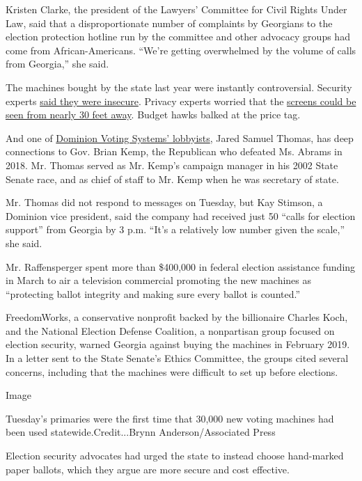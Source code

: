 Kristen Clarke, the president of the Lawyers' Committee for Civil Rights
Under Law, said that a disproportionate number of complaints by
Georgians to the election protection hotline run by the committee and
other advocacy groups had come from African-Americans. ``We're getting
overwhelmed by the volume of calls from Georgia,'' she said.

The machines bought by the state last year were instantly controversial.
Security experts
\href{https://www.politico.com/story/2019/03/28/georgia-voting-machines-safe-1241033}{said
they were insecure}. Privacy experts worried that the
\href{https://www.washingtonpost.com/politics/as-georgia-rolls-out-new-voting-machines-for-2020-worries-about-election-security-persist/2019/12/23/c5036d74-2017-11ea-bed5-880264cc91a9_story.html}{screens
could be seen from nearly 30 feet away}. Budget hawks balked at the
price tag.

And one of
\href{http://media.ethics.ga.gov/search/Lobbyist/Lobbyist_Name.aspx?\&FilerID=L20070103}{Dominion
Voting Systems' lobbyists}, Jared Samuel Thomas, has deep connections to
Gov. Brian Kemp, the Republican who defeated Ms. Abrams in 2018. Mr.
Thomas served as Mr. Kemp's campaign manager in his 2002 State Senate
race, and as chief of staff to Mr. Kemp when he was secretary of state.

Mr. Thomas did not respond to messages on Tuesday, but Kay Stimson, a
Dominion vice president, said the company had received just 50 ``calls
for election support'' from Georgia by 3 p.m. ``It's a relatively low
number given the scale,'' she said.

Mr. Raffensperger spent more than \$400,000 in federal election
assistance funding in March to air a television commercial promoting the
new machines as ``protecting ballot integrity and making sure every
ballot is counted.''

FreedomWorks, a conservative nonprofit backed by the billionaire Charles
Koch, and the National Election Defense Coalition, a nonpartisan group
focused on election security, warned Georgia against buying the machines
in February 2019. In a letter sent to the State Senate's Ethics
Committee, the groups cited several concerns, including that the
machines were difficult to set up before elections.

Image

Tuesday's primaries were the first time that 30,000 new voting machines
had been used statewide.Credit...Brynn Anderson/Associated Press

Election security advocates had urged the state to instead choose
hand-marked paper ballots, which they argue are more secure and cost
effective.


